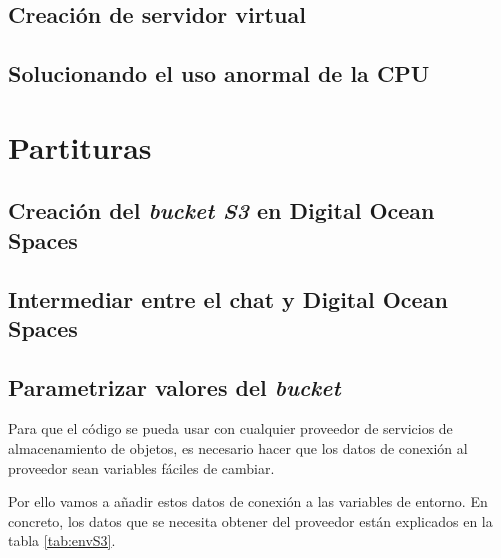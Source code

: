 



\subsection{Creación de servidor virtual}


\subsection{Solucionando el uso anormal de la CPU}


\section{Partituras}

\subsection{Creación del \textit{bucket S3} en Digital Ocean Spaces}

\subsection{Intermediar entre el chat y Digital Ocean Spaces}


\subsection{Parametrizar valores del \textit{bucket}}


Para que el código se pueda usar con cualquier proveedor de servicios de almacenamiento de objetos, es necesario hacer que los datos de conexión al proveedor sean variables fáciles de cambiar.

Por ello vamos a añadir estos datos de conexión a las variables de entorno. En concreto, los datos que se necesita obtener del proveedor están explicados en la tabla \ref{tab:envS3}.

